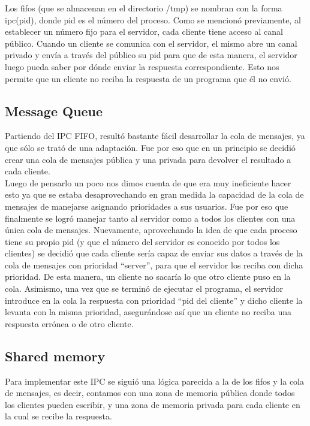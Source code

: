 \documentclass[a4paper, 10pt]{article}
\begin{document}
Los fifos (que se almacenan en el directorio /tmp) se nombran con la forma ipc(pid), donde pid es el número del proceso. Como se mencionó previamente, al establecer un número fijo para el servidor, cada cliente tiene acceso al canal público. Cuando un cliente se comunica con el servidor, el mismo abre un canal privado y envía a través del público su pid para que de esta manera, el servidor luego pueda saber por dónde enviar la respuesta correspondiente. Esto nos permite que un cliente no reciba la respuesta de un programa que él no envió.\\

\subsection{Message Queue}

Partiendo del IPC FIFO, resultó bastante fácil desarrollar la cola de mensajes, ya que sólo se trató de una adaptación. Fue por eso que en un principio se decidió crear una cola de mensajes pública y una privada para devolver el resultado a cada cliente.\\
Luego de pensarlo un poco nos dimos cuenta de que era muy ineficiente hacer esto ya que se estaba desaprovechando en gran medida la capacidad de la cola de mensajes de manejarse asignando prioridades a sus usuarios. Fue por eso que finalmente se logró manejar tanto al servidor como a todos los clientes con una única cola de mensajes. Nuevamente, aprovechando la idea de que cada proceso tiene su propio pid (y que el número del servidor es conocido por todos los clientes) se decidió que cada cliente sería capaz de enviar sus datos a través de la cola de mensajes con prioridad “server”, para que el servidor los reciba con dicha prioridad. De esta manera, un cliente no sacaría lo que otro cliente puso en la cola. Asimismo, una vez que se terminó de ejecutar el programa, el servidor introduce en la cola la respuesta con prioridad “pid del cliente” y dicho cliente la levanta con la misma prioridad, asegurándose así que un cliente no reciba una respuesta errónea o de otro cliente.

\subsection{Shared memory}

Para implementar este IPC se siguió una lógica parecida a la de los fifos y la cola de mensajes, es decir, contamos con una zona de memoria pública donde todos los clientes pueden escribir, y una zona de memoria privada para cada cliente en la cual se recibe la respuesta. \\
\end{document}
